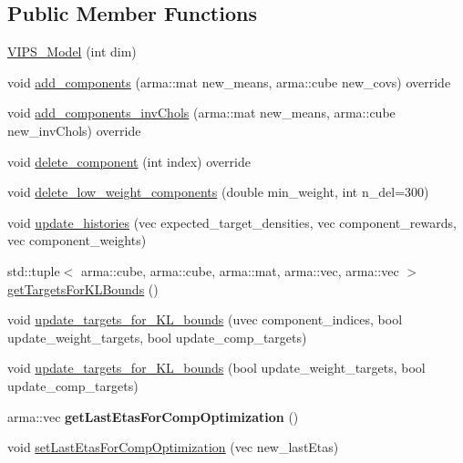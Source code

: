 \subsection*{Public Member Functions}
\begin{DoxyCompactItemize}
\item 
\hyperlink{classVIPS__Model_a178ab41d01041c53a3f6a7f33ec6f150}{V\+I\+P\+S\+\_\+\+Model} (int dim)
\item 
void \hyperlink{classVIPS__Model_afcc9485205fd0c61801546703bffa5eb}{add\+\_\+components} (arma\+::mat new\+\_\+means, arma\+::cube new\+\_\+covs) override
\item 
void \hyperlink{classVIPS__Model_ab83e56934a07a6381e0cb4f9beab26fd}{add\+\_\+components\+\_\+inv\+Chols} (arma\+::mat new\+\_\+means, arma\+::cube new\+\_\+inv\+Chols) override
\item 
void \hyperlink{classVIPS__Model_a6b0edde4a9a744639e1588cff6a5fa23}{delete\+\_\+component} (int index) override
\item 
void \hyperlink{classVIPS__Model_abbaa2af1802ba723708f11739525519b}{delete\+\_\+low\+\_\+weight\+\_\+components} (double min\+\_\+weight, int n\+\_\+del=300)
\item 
void \hyperlink{classVIPS__Model_acf045c351edff854a5f520beb2723832}{update\+\_\+histories} (vec expected\+\_\+target\+\_\+densities, vec component\+\_\+rewards, vec component\+\_\+weights)
\item 
std\+::tuple$<$ arma\+::cube, arma\+::cube, arma\+::mat, arma\+::vec, arma\+::vec $>$ \hyperlink{classVIPS__Model_a19bd5e5c123088de22c80df818f67994}{get\+Targets\+For\+K\+L\+Bounds} ()
\item 
void \hyperlink{classVIPS__Model_a6a99261a47556afce9b21c456000e44c}{update\+\_\+targets\+\_\+for\+\_\+\+K\+L\+\_\+bounds} (uvec component\+\_\+indices, bool update\+\_\+weight\+\_\+targets, bool update\+\_\+comp\+\_\+targets)
\item 
void \hyperlink{classVIPS__Model_ab4c62ebc6e2bc4c2bbefe65d95a66b00}{update\+\_\+targets\+\_\+for\+\_\+\+K\+L\+\_\+bounds} (bool update\+\_\+weight\+\_\+targets, bool update\+\_\+comp\+\_\+targets)
\item 
arma\+::vec {\bfseries get\+Last\+Etas\+For\+Comp\+Optimization} ()\hypertarget{classVIPS__Model_a8906614c09de390b4a9437cadd54218f}{}\label{classVIPS__Model_a8906614c09de390b4a9437cadd54218f}

\item 
void \hyperlink{classVIPS__Model_ac0f23dd73e953a9da2047075e6e3ff1c}{set\+Last\+Etas\+For\+Comp\+Optimization} (vec new\+\_\+last\+Etas)
\end{DoxyCompactItemize}
